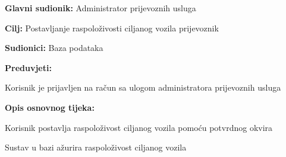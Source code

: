 					\noindent {}
					\begin{packed_item}
						\item \textbf{Glavni sudionik:} Administrator prijevoznih usluga
						\item  \textbf{Cilj:} Postavljanje raspoloživosti ciljanog vozila prijevoznik
						\item  \textbf{Sudionici:} Baza podataka
						\item  \textbf{Preduvjeti:}
						\item[] \begin{packed_enum}
							\item Korisnik je prijavljen na račun sa ulogom administratora prijevoznih usluga
						\end{packed_enum}
						
						\item  \textbf{Opis osnovnog tijeka:}
						\item[] \begin{packed_enum}
							\item Korisnik postavlja raspoloživost ciljanog vozila pomoću potvrdnog okvira
							\item Sustav u bazi ažurira raspoloživost ciljanog vozila
						\end{packed_enum}
					\end{packed_item}
					
